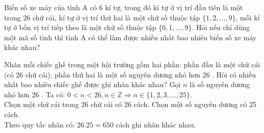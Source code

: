 \begin{bt}%
	 Biển số xe máy của tỉnh $\mathrm{A}$ có 6 kí tự, trong đó kí tự ở vị trí đầu tiên là một trong 26 chữ cái, kí tự ở vị trí thứ hai là một chữ số thuộc tập $\{1{,}2, \ldots, 9\}$, mỗi kí tự ở bốn vị trí tiếp theo là một chữ số thuộc tập $\{0{,}1, \ldots, 9\}$. Hỏi nếu chỉ dùng một mã số tình thì tỉnh $\mathrm{A}$ có thể làm được nhiều nhất bao nhiêu biển số xe máy khác nhau?
\end{bt}

\begin{bt}%
	Nhãn mỗi chiếc ghế trong một hội trường gồm hai phần: phần đầu là một chữ cái (có 26 chữ cái), phần thứ hai là một số nguyên dương nhỏ hơn 26 . Hỏi có nhiều nhất bao nhiêu chiếc ghế được ghi nhãn khác nhau?
\loigiai
{
Gọi $n$ là số nguyên dương nhỏ hơn 26 . Ta có: $0<n<26, n \in \mathbb{Z} \Rightarrow n \in\{1,2,3, \ldots, 25\}$.\\
Chọn một chữ cái trong 26 chữ cái có 26 cách. Chọn một số nguyên dương có 25 cách.\\
Theo quy tắc nhân có: $26.25=650$ cách ghi nhãn khác nhau.}
\end{bt}

